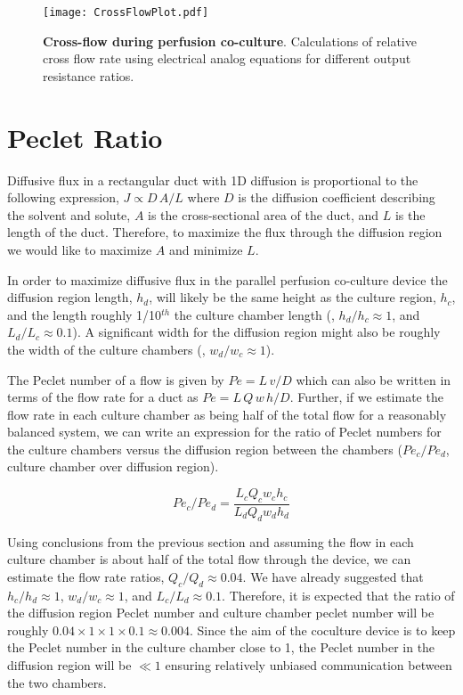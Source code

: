 \begin{figure}[!ht]
\centering
\texttt{[image: CrossFlowPlot.pdf]}
\caption{\textbf{Cross-flow during perfusion co-culture}. Calculations of relative cross flow rate using electrical analog equations for different output resistance ratios.}
\label{fig:crossFlow}
\end{figure}

\section{Peclet Ratio}

Diffusive flux in a rectangular duct with 1D diffusion is proportional to the following expression, $J \propto D\,A/L$ where $D$ is the diffusion coefficient describing the solvent and solute, $A$ is the cross-sectional area of the duct, and $L$ is the length of the duct. Therefore, to maximize the flux through the diffusion region we would like to maximize $A$ and minimize $L$.

In order to maximize diffusive flux in the parallel perfusion co-culture device the diffusion region length, $h_{d}$, will likely be the same height as the culture region, $h_{c}$, and the length roughly 1/10$^{th}$ the culture chamber length (\ie , $h_{d}/h_{c} \approx 1$, and $L_{d}/L_{c} \approx 0.1$). A significant width for the diffusion region might also be roughly the width of the culture chambers (\ie , $w_{d}/w_{c} \approx 1$).

The Peclet number of a flow is given by $Pe = L\,v/D$ which can also be written in terms of the flow rate for a duct as $Pe = L\, Q \, w \, h/D$. Further, if we estimate the flow rate in each culture chamber as being half of the total flow for a reasonably balanced system, we can write an expression for the ratio of Peclet numbers for the culture chambers versus the diffusion region between the chambers ($Pe_{c}/Pe_{d}$, culture chamber over diffusion region).

\begin{equation}
Pe_{c}/Pe_{d} = \frac{L_{c}Q_{c}w_{c}h_{c}}{L_{d}Q_{d}w_{d}h_{d}}
\end{equation}

Using conclusions from the previous section and assuming the flow in each culture chamber is about half of the total flow through the device, we can estimate the flow rate ratios, $Q_{c}/Q_{d} \approx 0.04$. We have already suggested that $h_{c}/h_{d} \approx 1$, $w_{d}/w_{c} \approx 1$, and $L_{c}/L_{d} \approx 0.1$. Therefore, it is expected that the ratio of the diffusion region Peclet number and culture chamber peclet number will be roughly $0.04 \times 1 \times 1 \times 0.1 \approx 0.004$. Since the aim of the coculture device is to keep the Peclet number in the culture chamber close to 1, the Peclet number in the diffusion region will be $\ll 1$ ensuring relatively unbiased communication between the two chambers.


